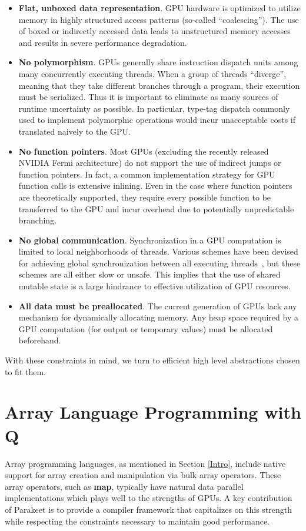 \documentclass[preprint]{sigplanconf}
\begin{document}
\begin{itemize}
\item \textbf{Flat, unboxed data representation}. GPU hardware is optimized to utilize memory in highly structured access patterns (so-called ``coalescing''). The use of boxed or indirectly accessed data leads to unstructured memory accesses and results in severe performance degradation.

\item \textbf{No polymorphism}. GPUs generally share instruction dispatch units among many concurrently executing threads. When a group of threads ``diverge'', meaning that they take different branches through a program, their execution must be serialized. Thus it is important to eliminate as many sources of runtime uncertainty as possible. In particular, type-tag dispatch commonly used to implement polymorphic operations would incur unacceptable costs if translated naively to the GPU.

\item \textbf {No function pointers}. Most GPUs (excluding the recently released NVIDIA Fermi architecture) do not support the use of indirect jumps or function pointers. In fact, a common implementation strategy for GPU function calls is extensive inlining. Even in the case where function pointers are theoretically supported, they require every possible function to be transferred to the GPU and incur overhead due to potentially unpredictable branching.

\item \textbf{No global communication}. Synchronization in a GPU computation is limited to local neighborhoods of threads. Various schemes have been devised for achieving global synchronization between all executing threads~\cite{feng10}, but these schemes are all either slow or unsafe. This implies that the use of shared mutable state is a large hindrance to effective utilization of GPU resources.

\item \textbf{All data must be preallocated}. The current generation of GPUs lack any mechanism for dynamically allocating memory. Any heap space required by a GPU computation (for output or temporary values) must be allocated beforehand.
\end{itemize}

With these constraints in mind, we turn to efficient high level abstractions chosen to fit them.

\section{Array Language Programming with Q}
\label{Q}
Array programming languages, as mentioned in Section \ref{Intro}, include native support for array creation and manipulation via bulk array operators. These array operators, such as \textbf{map}, typically have natural data parallel implementations which plays well to the strengths of GPUs.  A key contribution of Parakeet is to provide a compiler framework that capitalizes on this strength while respecting the constraints necessary to maintain good performance.
\end{document}
